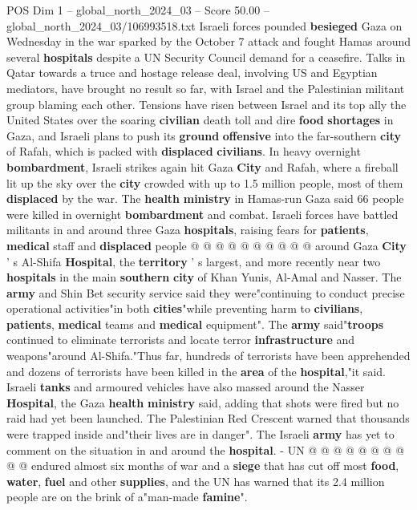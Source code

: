 \begin{textsample}{POS Dim 1 – global\_north\_2024\_03 – Score 50.00 – global\_north\_2024\_03/106993518.txt}  \label{ex:f1_pos_054}
Israeli forces pounded \textbf{besieged} Gaza on Wednesday in the war sparked by the October 7 attack and fought Hamas around several \textbf{hospitals} despite a UN Security Council demand for a ceasefire.
Talks in Qatar towards a truce and hostage release deal, involving US and Egyptian mediators, have brought no result so far, with Israel and the Palestinian militant group blaming each other.
Tensions have risen between Israel and its top ally the United States over the soaring \textbf{civilian} death toll and dire \textbf{food} \textbf{shortages} in Gaza, and Israeli plans to push its \textbf{ground} \textbf{offensive} into the far-southern \textbf{city} of Rafah, which is packed with \textbf{displaced} \textbf{civilians}.
In heavy overnight \textbf{bombardment}, Israeli strikes again hit Gaza \textbf{City} and Rafah, where a fireball lit up the sky over the \textbf{city} crowded with up to 1.5 million people, most of them \textbf{displaced} by the war.
The \textbf{health} \textbf{ministry} in Hamas-run Gaza said 66 people were killed in overnight \textbf{bombardment} and combat.
Israeli forces have battled militants in and around three Gaza \textbf{hospitals}, raising fears for \textbf{patients}, \textbf{medical} staff and \textbf{displaced} people @ @ @ @ @ @ @ @ @ @ around Gaza \textbf{City} ' s Al-Shifa \textbf{Hospital}, the \textbf{territory} ' s largest, and more recently near two \textbf{hospitals} in the main \textbf{southern} \textbf{city} of Khan Yunis, Al-Amal and Nasser.
The \textbf{army} and Shin Bet security service said they were"continuing to conduct precise operational activities"in both \textbf{cities}"while preventing harm to \textbf{civilians}, \textbf{patients}, \textbf{medical} teams and \textbf{medical} equipment".
The \textbf{army} said"\textbf{troops} continued to eliminate terrorists and locate terror \textbf{infrastructure} and weapons"around Al-Shifa."Thus far, hundreds of terrorists have been apprehended and dozens of terrorists have been killed in the \textbf{area} of the \textbf{hospital},"it said.
Israeli \textbf{tanks} and armoured vehicles have also massed around the Nasser \textbf{Hospital}, the Gaza \textbf{health} \textbf{ministry} said, adding that shots were fired but no raid had yet been launched.
The Palestinian Red Crescent warned that thousands were trapped inside and"their lives are in danger".
The Israeli \textbf{army} has yet to comment on the situation in and around the \textbf{hospital}. - UN @ @ @ @ @ @ @ @ @ @ endured almost six months of war and a \textbf{siege} that has cut off most \textbf{food}, \textbf{water}, \textbf{fuel} and other \textbf{supplies}, and the UN has warned that its 2.4 million people are on the brink of a"man-made \textbf{famine}".

\end{textsample}
